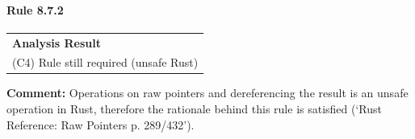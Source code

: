 \paragraph{Rule 8.7.2}
\begin{longtable}{p{13cm}}
\textbf{Analysis Result} \\
(C4) Rule still required (unsafe Rust) \\
\end{longtable}
\textbf{Comment:} Operations on raw pointers and dereferencing the result is an unsafe operation in Rust, therefore the rationale behind this rule is satisfied (`Rust Reference: Raw Pointers p. 289/432'). \\
